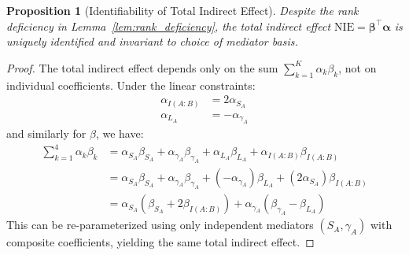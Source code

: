 \documentclass[10pt,a4paper]{amsart}
\newtheorem{proposition}{Proposition}
\begin{document}
\begin{proposition}[Identifiability of Total Indirect Effect]\label{prop:identifiable_indirect}
Despite the rank deficiency in Lemma~\ref{lem:rank_deficiency}, the total indirect effect $\text{NIE} = \bm{\beta}^\top\bm{\alpha}$ is uniquely identified and invariant to choice of mediator basis.
\end{proposition}

\begin{proof}
The total indirect effect depends only on the sum $\sum_{k=1}^K \alpha_k\beta_k$, not on individual coefficients. Under the linear constraints:
\begin{align}
\alpha_{I(A:B)} &= 2\alpha_{S_A} \\
\alpha_{L_A} &= -\alpha_{\gamma_A}
\end{align}
and similarly for $\beta$, we have:
\begin{align}
\sum_{k=1}^4 \alpha_k\beta_k &= \alpha_{S_A}\beta_{S_A} + \alpha_{\gamma_A}\beta_{\gamma_A} + \alpha_{L_A}\beta_{L_A} + \alpha_{I(A:B)}\beta_{I(A:B)} \\
&= \alpha_{S_A}\beta_{S_A} + \alpha_{\gamma_A}\beta_{\gamma_A} + (-\alpha_{\gamma_A})\beta_{L_A} + (2\alpha_{S_A})\beta_{I(A:B)} \\
&= \alpha_{S_A}(\beta_{S_A} + 2\beta_{I(A:B)}) + \alpha_{\gamma_A}(\beta_{\gamma_A} - \beta_{L_A})
\end{align}
This can be re-parameterized using only independent mediators $(S_A, \gamma_A)$ with composite coefficients, yielding the same total indirect effect.
\end{proof}
\end{document}
